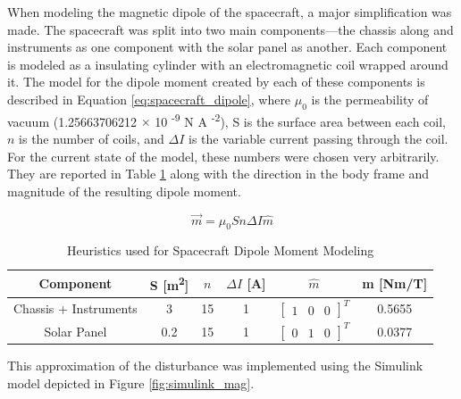 When modeling the magnetic dipole of the spacecraft, a major simplification was made. The spacecraft was split into two main components---the chassis along and instruments as one component with the solar panel as another. Each component is modeled as a insulating cylinder with an electromagnetic coil wrapped around it. The model for the dipole moment created by each of these components is described in Equation \ref{eq:spacecraft_dipole}, where $\mu_0$ is the permeability of vacuum (1.25663706212 $\times$ 10 \textsuperscript{-9} N A \textsuperscript{-2}), S is the surface area between each coil, $n$ is the number of coils, and $\Delta I$ is the variable current passing through the coil. For the current state of the model, these numbers were chosen very arbitrarily. They are reported in Table \ref{tab:spacecraft_dipole_data} along with the direction in the body frame and magnitude of the resulting dipole moment.

\begin{equation} \label{eq:spacecraft_dipole}
    \vec{m} = \mu_0 S n \Delta I \hat{m}
\end{equation}

\begin{table}[H]
    \centering
    \captionsetup{justification = centering}
    \begin{tabular}{c|ccccc}
    Component  & S [m\textsuperscript{2}] & $n$ & $\Delta I$ [A] & $\hat{m}$  & m [Nm/T] \\ \hline
    Chassis + Instruments &   3     &   15    &   1    &   $\begin{bmatrix}  1 & 0 & 0  \end{bmatrix}^T$    &  0.5655 \\
    Solar Panel &   0.2     &  15    &   1    &    $\begin{bmatrix}  0 & 1 & 0  \end{bmatrix}^T$   &  0.0377  \\  
    \end{tabular}
    \caption{Heuristics used for Spacecraft Dipole Moment Modeling}
    \label{tab:spacecraft_dipole_data}
\end{table}

This approximation of the disturbance was implemented using the Simulink model depicted in Figure \ref{fig:simulink_mag}.

